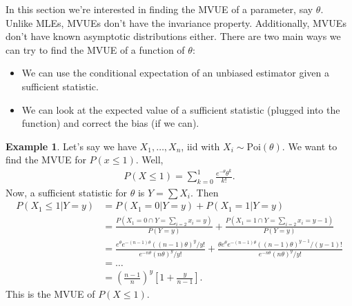 \documentclass{book}
\theoremstyle{definition}
\newtheorem{exmp}{Example}[section]
\newcommand{\nn}{\nonumber}
\newcommand{\f}[2]{\frac{#1}{#2}}
\newcommand{\lp}{\left(}
\newcommand{\rp}{\right)}
\newcommand{\lb}{\left[}
\newcommand{\rb}{\right]}
\begin{document}
In this section we're interested in finding the MVUE of a parameter, say $\theta$.  Unlike MLEs, MVUEs don't have the invariance property. Additionally, MVUEs don't have known asymptotic distributions either. There are two main ways we can try to find the MVUE of a function of $\theta$:
\begin{itemize}
	\item We can use the conditional expectation of an unbiased estimator given a sufficient statistic. 
	
	\item We can look at the expected value of a sufficient statistic (plugged into the function) and correct the bias (if we can). 
\end{itemize} 



\begin{exmp}
	Let's say we have $X_1,\dots,X_n$, iid with $X_i \sim \mbox{Poi}(\theta)$. We want to find the MVUE for $P(x\leq 1)$. Well,
	\begin{align}
	P(X\leq 1) = \sum^1_{k=0}\f{e^{-\theta}\theta^k}{k!}.
	\end{align}
	Now, a sufficient statistic for $\theta$ is $Y = \sum X_i$. Then
	\begin{align}
	P(X_1 \leq 1 \vert Y=y) &= P(X_1=0\vert Y=y) + P(X_1 = 1 \vert Y=y) \nn\\
	&= \f{P(X_1 = 0 \cap Y=\sum_{i=2} x_i = y)}{P(Y=y)} + \f{P(X_1 = 1 \cap Y= \sum_{i=2} x_i = y-1)}{P(Y=y)}\nn\\
	&= \f{e^{\theta}e^{-(n-1)\theta} ((n-1)\theta)^y/y!}{e^{-n\theta}(n\theta)^y/y!} + \f{\theta e^{\theta}e^{-(n-1)\theta} ((n-1)\theta)^{y-1}/(y-1)!}{e^{-n\theta}(n\theta)^y/y!}\nn\\
	&= \dots \nn\\
	&= \lp \f{n-1}{n} \rp^y\lb 1 + \f{y}{n-1} \rb.
	\end{align}
	This is the MVUE of $P(X \leq 1)$. 
	
	
	
	
\end{exmp}
\end{document}
